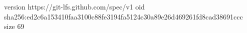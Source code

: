 version https://git-lfs.github.com/spec/v1
oid sha256:ed2c6a153410faa3100c88fe3194fa5124c30a89e26d469261fd8cad38691ccc
size 69
